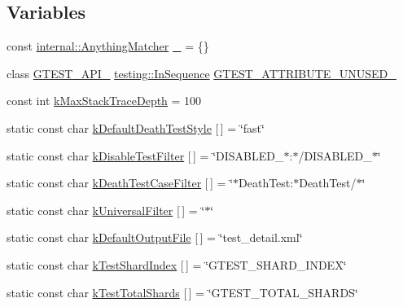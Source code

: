 \subsection*{Variables}
\begin{DoxyCompactItemize}
\item 
const \hyperlink{classtesting_1_1internal_1_1AnythingMatcher}{internal\+::\+Anything\+Matcher} \hyperlink{namespacetesting_a4ba77a3f5b67166ff1b59d96a32346a2}{\+\_\+} = \{\}
\item 
class \hyperlink{gtest-port_8h_aa73be6f0ba4a7456180a94904ce17790}{G\+T\+E\+S\+T\+\_\+\+A\+P\+I\+\_\+} \hyperlink{classtesting_1_1InSequence}{testing\+::\+In\+Sequence} \hyperlink{namespacetesting_ae028f80705ba0f84ce7d036bf3793448}{G\+T\+E\+S\+T\+\_\+\+A\+T\+T\+R\+I\+B\+U\+T\+E\+\_\+\+U\+N\+U\+S\+E\+D\+\_\+}
\item 
const int \hyperlink{namespacetesting_ae605f2ccac04616bb7812ca72e517082}{k\+Max\+Stack\+Trace\+Depth} = 100
\item 
static const char \hyperlink{namespacetesting_a317291240e750e2142a23cbd52bc5aec}{k\+Default\+Death\+Test\+Style} \mbox{[}$\,$\mbox{]} = \char`\"{}fast\char`\"{}
\item 
static const char \hyperlink{namespacetesting_a0a2a3239fb038e7ce83195d89941872d}{k\+Disable\+Test\+Filter} \mbox{[}$\,$\mbox{]} = \char`\"{}D\+I\+S\+A\+B\+L\+E\+D\+\_\+$\ast$\+:$\ast$/D\+I\+S\+A\+B\+L\+E\+D\+\_\+$\ast$\char`\"{}
\item 
static const char \hyperlink{namespacetesting_a23c33f4bfcc3c2e5e620eff31a98892d}{k\+Death\+Test\+Case\+Filter} \mbox{[}$\,$\mbox{]} = \char`\"{}$\ast$Death\+Test\+:$\ast$Death\+Test/$\ast$\char`\"{}
\item 
static const char \hyperlink{namespacetesting_a236f8612e4b148d8d989a311a30a4557}{k\+Universal\+Filter} \mbox{[}$\,$\mbox{]} = \char`\"{}$\ast$\char`\"{}
\item 
static const char \hyperlink{namespacetesting_aa5a002b5bb3784c830b1c99aa2688f27}{k\+Default\+Output\+File} \mbox{[}$\,$\mbox{]} = \char`\"{}test\+\_\+detail.\+xml\char`\"{}
\item 
static const char \hyperlink{namespacetesting_a5f76dfdb8cb2664da54e320ecaba3643}{k\+Test\+Shard\+Index} \mbox{[}$\,$\mbox{]} = \char`\"{}G\+T\+E\+S\+T\+\_\+\+S\+H\+A\+R\+D\+\_\+\+I\+N\+D\+EX\char`\"{}
\item 
static const char \hyperlink{namespacetesting_a7542311baba200ebabd4065717606f6e}{k\+Test\+Total\+Shards} \mbox{[}$\,$\mbox{]} = \char`\"{}G\+T\+E\+S\+T\+\_\+\+T\+O\+T\+A\+L\+\_\+\+S\+H\+A\+R\+DS\char`\"{}

\end{DoxyCompactItemize}
